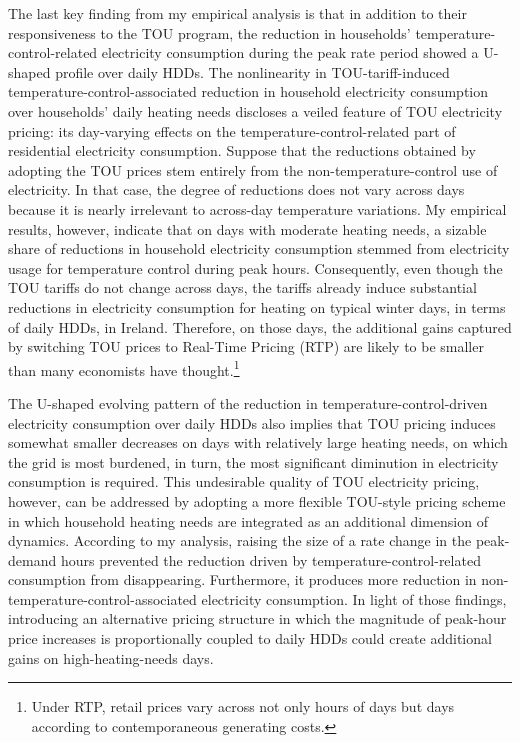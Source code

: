 The last key finding from my empirical analysis is that in addition to their responsiveness to the TOU program, the reduction in households' temperature-control-related electricity consumption during the peak rate period showed a U-shaped profile over daily HDDs. The nonlinearity in TOU-tariff-induced temperature-control-associated reduction in household electricity consumption over households' daily heating needs discloses a veiled feature of TOU electricity pricing: its day-varying effects on the temperature-control-related part of residential electricity consumption. Suppose that the reductions obtained by adopting the TOU prices stem entirely from the non-temperature-control use of electricity. In that case, the degree of reductions does not vary across days because it is nearly irrelevant to across-day temperature variations. My empirical results, however, indicate that on days with moderate heating needs, a sizable share of reductions in household electricity consumption stemmed from electricity usage for temperature control during peak hours. Consequently, even though the TOU tariffs do not change across days, the tariffs already induce substantial reductions in electricity consumption for heating on typical winter days, in terms of daily HDDs, in Ireland. Therefore, on those days, the additional gains captured by switching TOU prices to Real-Time Pricing (RTP) are likely to be smaller than many economists have thought.\footnote{Under RTP, retail prices vary across not only hours of days but days according to contemporaneous generating costs.} 

The U-shaped evolving pattern of the reduction in temperature-control-driven electricity consumption over daily HDDs also implies that TOU pricing induces somewhat smaller decreases on days with relatively large heating needs, on which the grid is most burdened, in turn, the most significant diminution in electricity consumption is required. This undesirable quality of TOU electricity pricing, however, can be addressed by adopting a more flexible TOU-style pricing scheme in which household heating needs are integrated as an additional dimension of dynamics. According to my analysis, raising the size of a rate change in the peak-demand hours prevented the reduction driven by temperature-control-related consumption from disappearing. Furthermore, it produces more reduction in non-temperature-control-associated electricity consumption. In light of those findings, introducing an alternative pricing structure in which the magnitude of peak-hour price increases is proportionally coupled to daily HDDs could create additional gains on high-heating-needs days. 

